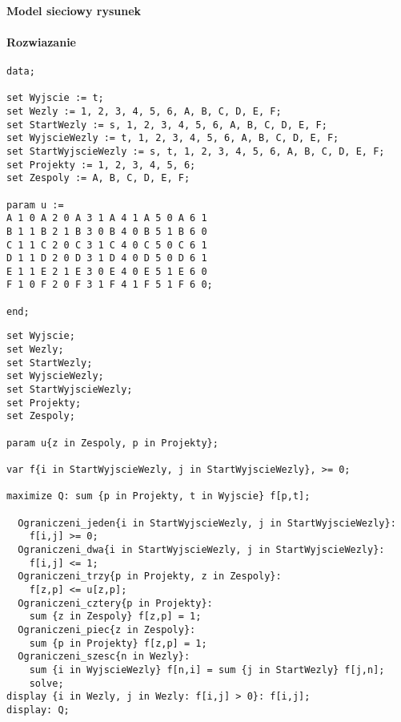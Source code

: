 \documentclass[12pt]{article}
\begin{document}
\paragraph{Model sieciowy rysunek}

\paragraph{Rozwiazanie}
\begin{lstlisting}[caption= plik dat]
data; 
 
set Wyjscie := t; 
set Wezly := 1, 2, 3, 4, 5, 6, A, B, C, D, E, F; 
set StartWezly := s, 1, 2, 3, 4, 5, 6, A, B, C, D, E, F; 
set WyjscieWezly := t, 1, 2, 3, 4, 5, 6, A, B, C, D, E, F; 
set StartWyjscieWezly := s, t, 1, 2, 3, 4, 5, 6, A, B, C, D, E, F; 
set Projekty := 1, 2, 3, 4, 5, 6; 
set Zespoly := A, B, C, D, E, F; 
 
param u := 
A 1 0 A 2 0 A 3 1 A 4 1 A 5 0 A 6 1
B 1 1 B 2 1 B 3 0 B 4 0 B 5 1 B 6 0 
C 1 1 C 2 0 C 3 1 C 4 0 C 5 0 C 6 1 
D 1 1 D 2 0 D 3 1 D 4 0 D 5 0 D 6 1 
E 1 1 E 2 1 E 3 0 E 4 0 E 5 1 E 6 0 
F 1 0 F 2 0 F 3 1 F 4 1 F 5 1 F 6 0; 
 
end; 
\end{lstlisting}
\begin{lstlisting}[caption= plik mod]
set Wyjscie; 
set Wezly; 
set StartWezly; 
set WyjscieWezly; 
set StartWyjscieWezly; 
set Projekty; 
set Zespoly; 
 
param u{z in Zespoly, p in Projekty}; 
 
var f{i in StartWyjscieWezly, j in StartWyjscieWezly}, >= 0; 
 
maximize Q: sum {p in Projekty, t in Wyjscie} f[p,t]; 
 
  Ograniczeni_jeden{i in StartWyjscieWezly, j in StartWyjscieWezly}: 
    f[i,j] >= 0; 
  Ograniczeni_dwa{i in StartWyjscieWezly, j in StartWyjscieWezly}: 
    f[i,j] <= 1; 
  Ograniczeni_trzy{p in Projekty, z in Zespoly}: 
    f[z,p] <= u[z,p]; 
  Ograniczeni_cztery{p in Projekty}: 
    sum {z in Zespoly} f[z,p] = 1; 
  Ograniczeni_piec{z in Zespoly}: 
    sum {p in Projekty} f[z,p] = 1; 
  Ograniczeni_szesc{n in Wezly}: 
    sum {i in WyjscieWezly} f[n,i] = sum {j in StartWezly} f[j,n]; 
	solve; 
display {i in Wezly, j in Wezly: f[i,j] > 0}: f[i,j]; 
display: Q;


\end{lstlisting}
\end{document}
